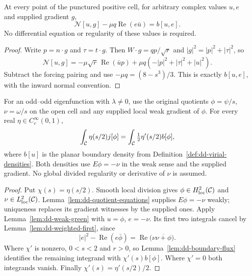 \begin{lemma}
\label{lem:dd-boundary-flux}
\leanok
At every point of the punctured positive cell, for arbitrary complex
values $u,e$ and supplied gradient $g$,
\[
 \mathcal N[u,g]-\mu q\operatorname{Re}(e\bar u)=b[u,e].
\]
No differential equation or regularity of these values is required.
\end{lemma}

\begin{proof}
\leanok
Write $p=n\cdot g$ and $\tau=t\cdot g$.
Then $W\cdot g=qp/\sqrt r$ and $|g|^2=|p|^2+|\tau|^2$, so
\[
 \mathcal N[u,g]
 =-\mu\sqrt r\,\operatorname{Re}(\bar u p)
   +\mu q(-|p|^2+|\tau|^2+|u|^2).
\]
Subtract the forcing pairing and use $-\mu q=(8-s^3)/3$.
This is exactly $b[u,e]$, with the inward normal convention.
\end{proof}

\begin{lemma}
\label{lem:dd-cutoff-identity}
\leanok
For an odd--odd eigenfunction with $\lambda\ne0$, use the original
quotients $\phi=\psi/s$, $\nu=\omega/s$ on the open cell and any supplied
local weak gradient of $\phi$. For every real
$\eta\in C_c^\infty(0,1)$,
\[
 \int_{\mathcal{C}} \eta(s/2)j[\phi]
 =\int_{\mathcal{C}} \tfrac12\eta'(s/2)b[\phi],
\]
where $b[u]$ is the planar boundary density from
Definition~\ref{def:dd-virial-densities}. Both densities use $E\phi=-\nu$
in the weak sense and the supplied gradient. No global divided regularity
or derivative of $\nu$ is assumed.
\end{lemma}

\begin{proof}
\leanok
Put $\chi(s)=\eta(s/2)$. Smooth local division gives
$\phi\in H^2_{\mathrm{loc}}(\mathcal{C})$ and
$\nu\in L^2_{\mathrm{loc}}(\mathcal{C})$.
Lemma~\ref{lem:dd-quotient-equations} supplies $E\phi=-\nu$ weakly;
uniqueness replaces its gradient witnesses by the supplied ones.
Apply Lemma~\ref{lem:dd-weak-green} with $u=\phi$, $e=-\nu$.
Its first two integrals cancel by Lemma~\ref{lem:dd-weighted-first}, since
\[
 |e|^2-\operatorname{Re}(e\bar\phi)
   =\operatorname{Re}\bigl(\nu\overline{\nu+\phi}\bigr).
\]
Where $\chi'$ is nonzero, $0<s<2$ and $r>0$, so
Lemma~\ref{lem:dd-boundary-flux} identifies the remaining integrand
with $\chi'(s)b[\phi]$. Where $\chi'=0$ both integrands vanish.
Finally $\chi'(s)=\eta'(s/2)/2$.
\end{proof}

